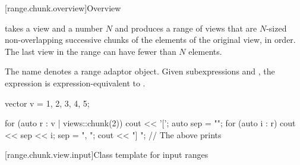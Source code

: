 [range.chunk.overview]{Overview}

\pnum
{} takes a view and a number $N$ and
produces a range of views
that are $N$-sized non-overlapping successive chunks of
the elements of the original view, in order.
The last view in the range can have fewer than $N$ elements.

\pnum
{}%
The name  denotes
a range adaptor object.
Given subexpressions  and ,
the expression  is expression-equivalent to
.

\begin{example}
\begin{codeblock}
vector v = {1, 2, 3, 4, 5};

for (auto r : v | views::chunk(2)) {
  cout << '[';
  auto sep = "";
  for (auto i : r) {
    cout << sep << i;
    sep = ", ";
  }
  cout << "] ";
}
// The above prints \tcode{[1, 2] [3, 4] [5]}
\end{codeblock}
\end{example}

[range.chunk.view.input]{Class template  for input ranges}

